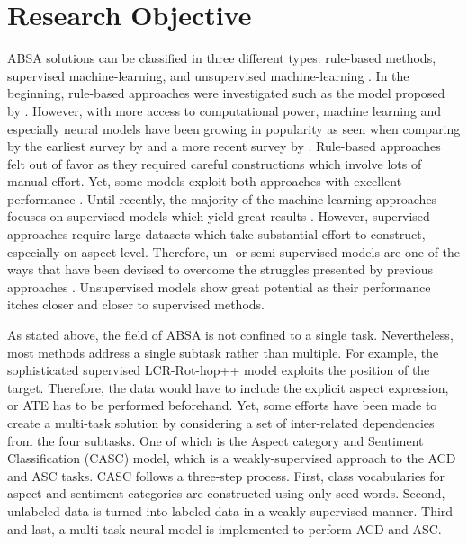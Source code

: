 \documentclass[american, oneside]{ecsgdp}
\begin{document}
\section{Research Objective} \label{sec:objective}
ABSA solutions can be classified in three different types: rule-based methods, supervised machine-learning, and unsupervised machine-learning \parencite{Schouten2016Survey}. In the beginning, rule-based approaches were investigated such as the model proposed by \textcite{Hu2004Rules}. However, with more access to computational power, machine learning and especially neural models have been growing in popularity as seen when comparing by the earliest survey by \textcite{Schouten2016Survey} and a more recent survey by \textcite{Zhang2022Survey}. Rule-based approaches felt out of favor as they required careful constructions which involve lots of manual effort. Yet, some models exploit both approaches with excellent performance \parencite{Trusca2020HAABSA++, Meskele2020ALDONAr}. Until recently, the majority of the machine-learning approaches focuses on supervised models which yield great results \parencite{Zhang2022Survey}. However, supervised approaches require large datasets which take substantial effort to construct, especially on aspect level. Therefore, un- or semi-supervised models are one of the ways that have been devised to overcome the struggles presented by previous approaches \parencite{He2017ABAE}. Unsupervised models show great potential as their performance itches closer and closer to supervised methods. %

As stated above, the field of ABSA is not confined to a single task. Nevertheless, most methods address a single subtask rather than multiple. For example, the sophisticated supervised LCR-Rot-hop++ \parencite{Trusca2020HAABSA++} model exploits the position of the target. Therefore, the data would have to include the explicit aspect expression, or ATE has to be performed beforehand. Yet, some efforts have been made to create a multi-task solution by considering a set of inter-related dependencies from the four subtasks. One of which is the Aspect category and Sentiment Classification (CASC) \parencite{Kumar2021CASC} model, which is a weakly-supervised approach to the ACD and ASC tasks. CASC follows a three-step process. First, class vocabularies for aspect and sentiment categories are constructed using only seed words. Second, unlabeled data is turned into labeled data in a weakly-supervised manner. Third and last, a multi-task neural model is implemented to perform ACD and ASC.
\end{document}
